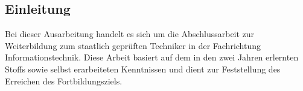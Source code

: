 \subsection{Einleitung}\label{vw_einleitung}
Bei dieser Ausarbeitung handelt es sich um die Abschlussarbeit zur Weiterbildung zum staatlich geprüften Techniker in der Fachrichtung Informationstechnik. Diese Arbeit basiert auf dem in den zwei Jahren erlernten Stoffs sowie selbst erarbeiteten Kenntnissen und dient zur Feststellung des Erreichen des Fortbildungsziels.